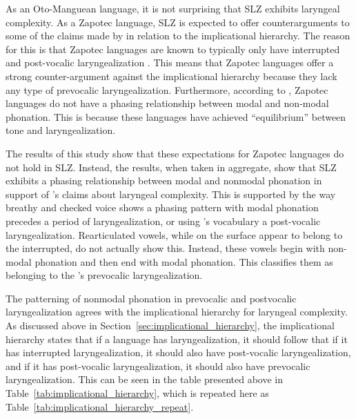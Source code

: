 As an Oto-Manguean language, it is not surprising that SLZ exhibits laryngeal complexity. As a Zapotec language, SLZ is expected to offer counterarguments to some of the claims made by \citet{silvermanLaryngealComplexityOtomanguean1997,silvermanPhasingRecoverability1997} in relation to the implicational hierarchy. The reason for this is that Zapotec languages are known to typically only have interrupted and post-vocalic laryngealization \citep{arellanesarellanesSistemaFonologicoPropiedades2009,arellanesarellanesDosGradosLaringizacion2010,ariza-garciaPhonationTypesTones2018,avelinoTopicsYalalagZapotec2004,avelinoAcousticElectroglottographicAnalyses2010,espositoSantaAnaValle2004,espositoVariationContrastivePhonation2010}. This means that Zapotec languages offer a strong counter-argument against the implicational hierarchy because they lack any type of prevocalic laryngealization. Furthermore, according to \citet{herrerazendejasAmuzgoZapotecTwo2000}, Zapotec languages do not have a phasing relationship between modal and non-modal phonation. This is because these languages have achieved ``equilibrium'' between tone and laryngealization. 

The results of this study show that these expectations for Zapotec languages do not hold in SLZ. Instead, the results, when taken in aggregate, show that SLZ exhibits a phasing relationship between modal and nonmodal phonation in support of \citeauthor{silvermanLaryngealComplexityOtomanguean1997}'s \citeyear{silvermanLaryngealComplexityOtomanguean1997,silvermanPhasingRecoverability1997} claims about laryngeal complexity. This is supported by the way breathy and checked voice shows a phasing pattern with modal phonation precedes a period of laryngealization, or using \citeauthor{silvermanLaryngealComplexityOtomanguean1997}'s \citeyear{silvermanLaryngealComplexityOtomanguean1997} vocabulary a post-vocalic laryngealization. Rearticulated vowels, while on the surface appear to belong to the interrupted, do not actually show this. Instead, these vowels begin with non-modal phonation and then end with modal phonation. This classifies them as belonging to the \citeauthor{silvermanLaryngealComplexityOtomanguean1997}'s \citeyear{silvermanLaryngealComplexityOtomanguean1997} prevocalic laryngealization. 

The patterning of nonmodal phonation in prevocalic and postvocalic laryngealization agrees with the implicational hierarchy for laryngeal complexity. As discussed above in Section~\ref{sec:implicational_hierarchy}, the implicational hierarchy states that if a language has laryngealization, it should follow that if it has interrupted laryngealization, it should also have post-vocalic laryngealization, and if it has post-vocalic laryngealization, it should also have prevocalic laryngealization. This can be seen in the table presented above in Table~\ref{tab:implicational_hierarchy}, which is repeated here as Table~\ref{tab:implicational_hierarchy_repeat}.

